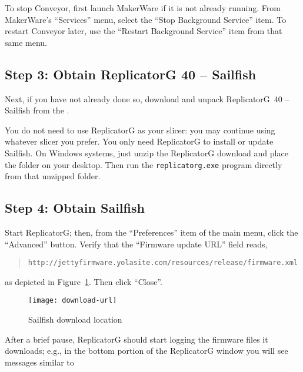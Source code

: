 To stop Conveyor, first
launch MakerWare if it is not already running.  From MakerWare's ``Services''
menu, select the ``Stop Background Service'' item. To restart Conveyor later,
use the ``Restart Background Service'' item from that same menu.


\subsection{Step 3: Obtain ReplicatorG 40 -- Sailfish}

Next, if you have not already done so, download and unpack ReplicatorG~40 --
Sailfish from the
.

You do not need to use ReplicatorG as your \gls{slicer}: you may continue using
whatever \gls{slicer} you prefer.  You only need ReplicatorG to install or update
Sailfish.  On Windows systems, just unzip the ReplicatorG download and place
the folder on your desktop.  Then run the \texttt{replicatorg.exe} program
directly from that unzipped folder.


\subsection{Step 4: Obtain Sailfish} \label{sec:download-url}

Start ReplicatorG; then, from the ``Preferences'' item of the main menu,
click the ``Advanced'' button.  Verify that the ``Firm\-ware update
URL'' field reads,
\begin{quote}
{\hspace{-30pt}\smaller\texttt{http://jettyfirmware.yolasite.com/resources/release/firmware.xml}}
\end{quote}
as depicted in Figure~\ref{fig:download-url}. Then click ``Close''.

\begin{figure}[!htbp]
  \centering
    \texttt{[image: download-url]}
    \caption{Sailfish download location}
  \label{fig:download-url}
\end{figure}

After a brief pause, ReplicatorG should start logging the firmware files it
downloads; e.g., in the bottom portion of the ReplicatorG window you will
see messages similar to

